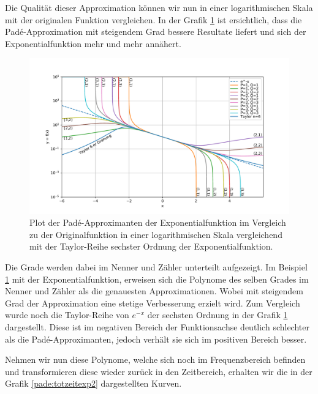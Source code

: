 Die Qualität dieser Approximation können wir nun in einer logarithmischen Skala mit der originalen Funktion vergleichen.
In der Grafik \ref{pade:totzeitexp} ist ersichtlich, dass die Padé-Approximation mit steigendem Grad bessere Resultate liefert und sich der Exponentialfunktion mehr und mehr annähert.

\begin{figure}[!h]
	\centering
	\includegraphics[width=1\linewidth]{./papers/pade/python/bilder/totzeit.pdf}
	\caption{Plot der Padé-Approximanten der Exponentialfunktion im Vergleich zu der Originalfunktion in einer logarithmischen Skala vergleichend mit der Taylor-Reihe sechster Ordnung der Exponentialfunktion.\label{pade:totzeitexp}}
\end{figure}

Die Grade werden dabei im Nenner und Zähler unterteilt aufgezeigt.
Im Beispiel \ref{pade:totzeitexp} mit der Exponentialfunktion, erweisen sich die Polynome des selben Grades im Nenner und Zähler als die genauesten Approximationen.
Wobei mit steigendem Grad der Approximation eine stetige Verbesserung erzielt wird.
Zum Vergleich wurde noch die Taylor-Reihe von $e^{-x}$ der sechsten Ordnung in der Grafik \ref{pade:totzeitexp} dargestellt. 
Diese ist im negativen Bereich der Funktionsachse deutlich schlechter als die Padé-Approximanten, jedoch verhält sie sich im positiven Bereich besser.


Nehmen wir nun diese Polynome, welche sich noch im Frequenzbereich befinden und transformieren diese wieder zurück in den Zeitbereich, erhalten wir die in der Grafik \ref{pade:totzeitexp2} dargestellten Kurven.

